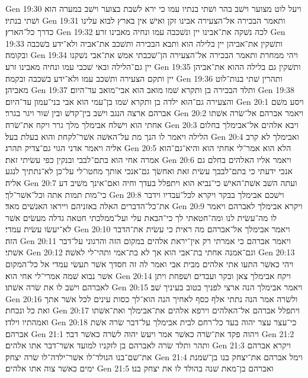 Gen 19:30  ויעל לוט מצוער וישׁב בהר ושׁתי בנתיו עמו כי ירא לשׁבת בצוער וישׁב במערה הוא ושׁתי בנתיו׃
Gen 19:31  ותאמר הבכירה אל־הצעירה אבינו זקן ואישׁ אין בארץ לבוא עלינו כדרך כל־הארץ׃
Gen 19:32  לכה נשׁקה את־אבינו יין ונשׁכבה עמו ונחיה מאבינו זרע׃
Gen 19:33  ותשׁקין את־אביהן יין בלילה הוא ותבא הבכירה ותשׁכב את־אביה ולא־ידע בשׁכבה ובקומה׃
Gen 19:34  ויהי ממחרת ותאמר הבכירה אל־הצעירה הן־שׁכבתי אמשׁ את־אבי נשׁקנו יין גם־הלילה ובאי שׁכבי עמו ונחיה מאבינו זרע׃
Gen 19:35  ותשׁקין גם בלילה ההוא את־אביהן יין ותקם הצעירה ותשׁכב עמו ולא־ידע בשׁכבה ובקמה׃
Gen 19:36  ותהרין שׁתי בנות־לוט מאביהן׃
Gen 19:37  ותלד הבכירה בן ותקרא שׁמו מואב הוא אבי־מואב עד־היום׃
Gen 19:38  והצעירה גם־הוא ילדה בן ותקרא שׁמו בן־עמי הוא אבי בני־עמון עד־היום׃
Gen 20:1  ויסע משׁם אברהם ארצה הנגב וישׁב בין־קדשׁ ובין שׁור ויגר בגרר׃
Gen 20:2  ויאמר אברהם אל־שׂרה אשׁתו אחתי הוא וישׁלח אבימלך מלך גרר ויקח את־שׂרה׃
Gen 20:3  ויבא אלהים אל־אבימלך בחלום הלילה ויאמר לו הנך מת על־האשׁה אשׁר־לקחת והוא בעלת בעל׃
Gen 20:4  ואבימלך לא קרב אליה ויאמר אדני הגוי גם־צדיק תהרג׃
Gen 20:5  הלא הוא אמר־לי אחתי הוא והיא־גם־הוא אמרה אחי הוא בתם־לבבי ובנקין כפי עשׂיתי זאת׃
Gen 20:6  ויאמר אליו האלהים בחלם גם אנכי ידעתי כי בתם־לבבך עשׂית זאת ואחשׂך גם־אנכי אותך מחטו־לי על־כן לא־נתתיך לנגע אליה׃
Gen 20:7  ועתה השׁב אשׁת־האישׁ כי־נביא הוא ויתפלל בעדך וחיה ואם־אינך משׁיב דע כי־מות תמות אתה וכל־אשׁר־לך׃
Gen 20:8  וישׁכם אבימלך בבקר ויקרא לכל־עבדיו וידבר את־כל־הדברים האלה באזניהם וייראו האנשׁים מאד׃
Gen 20:9  ויקרא אבימלך לאברהם ויאמר לו מה־עשׂית לנו ומה־חטאתי לך כי־הבאת עלי ועל־ממלכתי חטאה גדלה מעשׂים אשׁר לא־יעשׂו עשׂית עמדי׃
Gen 20:10  ויאמר אבימלך אל־אברהם מה ראית כי עשׂית את־הדבר הזה׃
Gen 20:11  ויאמר אברהם כי אמרתי רק אין־יראת אלהים במקום הזה והרגוני על־דבר אשׁתי׃
Gen 20:12  וגם־אמנה אחתי בת־אבי הוא אך לא בת־אמי ותהי־לי לאשׁה׃
Gen 20:13  ויהי כאשׁר התעו אתי אלהים מבית אבי ואמר לה זה חסדך אשׁר תעשׂי עמדי אל כל־המקום אשׁר נבוא שׁמה אמרי־לי אחי הוא׃
Gen 20:14  ויקח אבימלך צאן ובקר ועבדים ושׁפחת ויתן לאברהם וישׁב לו את שׂרה אשׁתו׃
Gen 20:15  ויאמר אבימלך הנה ארצי לפניך בטוב בעיניך שׁב׃
Gen 20:16  ולשׂרה אמר הנה נתתי אלף כסף לאחיך הנה הוא־לך כסות עינים לכל אשׁר אתך ואת כל ונכחת׃
Gen 20:17  ויתפלל אברהם אל־האלהים וירפא אלהים את־אבימלך ואת־אשׁתו ואמהתיו וילדו׃
Gen 20:18  כי־עצר עצר יהוה בעד כל־רחם לבית אבימלך על־דבר שׂרה אשׁת אברהם׃
Gen 21:1  ויהוה פקד את־שׂרה כאשׁר אמר ויעשׂ יהוה לשׂרה כאשׁר דבר׃
Gen 21:2  ותהר ותלד שׂרה לאברהם בן לזקניו למועד אשׁר־דבר אתו אלהים׃
Gen 21:3  ויקרא אברהם את־שׁם־בנו הנולד־לו אשׁר־ילדה־לו שׂרה יצחק׃
Gen 21:4  וימל אברהם את־יצחק בנו בן־שׁמנת ימים כאשׁר צוה אתו אלהים׃
Gen 21:5  ואברהם בן־מאת שׁנה בהולד לו את יצחק בנו׃
